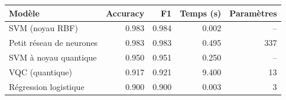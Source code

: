 \begin{tabular}{lrrrr}
\toprule
Modèle & Accuracy & F1 & Temps (s) & Paramètres \\
\midrule
SVM (noyau RBF) & 0.983 & 0.984 & 0.002 & -- \\
Petit réseau de neurones & 0.983 & 0.983 & 0.495 & 337 \\
SVM à noyau quantique & 0.950 & 0.951 & 0.250 & -- \\
VQC (quantique) & 0.917 & 0.921 & 9.400 & 13 \\
Régression logistique & 0.900 & 0.900 & 0.003 & 3 \\
\bottomrule
\end{tabular}
